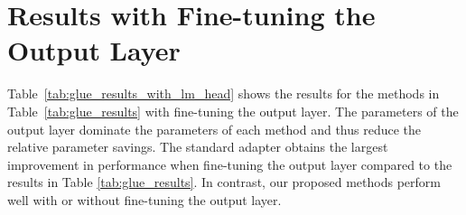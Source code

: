 \documentclass{article}
\begin{document}
\begin{table}[tp]
\begin{adjustbox}{max width=\textwidth}
\end{adjustbox}
\label{tab:ablations}
\end{table} 



\section{Results with Fine-tuning the Output Layer}\label{app:with_lm_head}
Table~\ref{tab:glue_results_with_lm_head} shows the results for the methods in Table~\ref{tab:glue_results} with fine-tuning the output layer. The parameters of the output layer dominate the parameters of each method and thus reduce the relative parameter savings. The standard adapter obtains the largest improvement in performance when fine-tuning the output layer compared to the results in Table \ref{tab:glue_results}. In contrast, our proposed methods perform well with or without fine-tuning the output layer.
\end{document}
